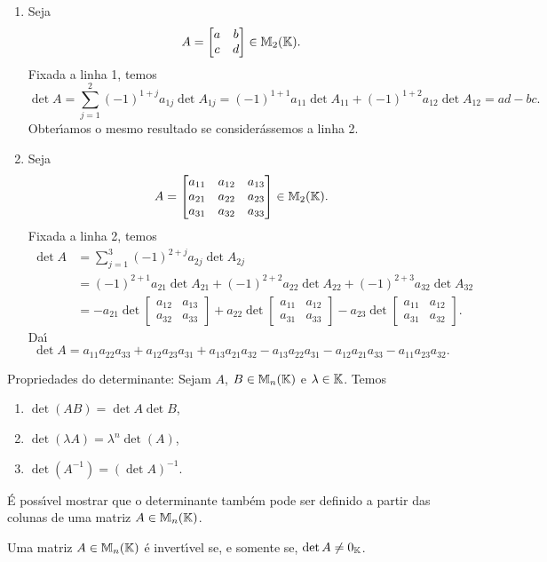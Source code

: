 \begin{exemplo}
\begin{enumerate}
	\item Seja
	\[
	A = \begin{bmatrix}
	a & b\\
	c & d
	\end{bmatrix} \in \mathbb{M}_2(\mathbb{K}).
	\]
	Fixada a linha 1, temos
	\[
	\det A = \sum_{j = 1}^2(-1)^{1 + j}a_{1j}\det A_{1j} = (-1)^{1 + 1}a_{11}\det A_{11} + (-1)^{1 + 2}a_{12}\det A_{12} = ad - bc.
	\]
	Obter{\'\i}amos o mesmo resultado se consider\'assemos a linha 2.

	\item Seja
	\[
	A = \begin{bmatrix}
	a_{11} & a_{12} & a_{13}\\
	a_{21} & a_{22} & a_{23}\\
	a_{31} & a_{32} & a_{33}
	\end{bmatrix} \in \mathbb{M}_2(\mathbb{K}).
	\]
	Fixada a linha 2, temos
	\begin{align*}
	\det A &= \sum_{j = 1}^3(-1)^{2 + j}a_{2j}\det A_{2j} \\ &= (-1)^{2 + 1}a_{21}\det A_{21} + (-1)^{2 + 2}a_{22}\det A_{22} + (-1)^{2 + 3}a_{32}\det A_{32}\\ &= -a_{21}\det\begin{bmatrix}a_{12} & a_{13}\\a_{32} & a_{33}\end{bmatrix} + a_{22}\det\begin{bmatrix}a_{11} & a_{12}\\a_{31} & a_{33}\end{bmatrix} - a_{23}\det\begin{bmatrix}a_{11} & a_{12}\\a_{31} & a_{32}\end{bmatrix}.
	\end{align*}
	Da{\'\i}
	\[
	\det A = a_{11}a_{22}a_{33} + a_{12}a_{23}a_{31} + a_{13}a_{21}a_{32} - a_{13}a_{22}a_{31} - a_{12}a_{21}a_{33} - 
	a_{11}a_{23}a_{32}.
	\]
\end{enumerate}
\end{exemplo}

Propriedades do determinante: Sejam $A$, $B \in \mathbb{M}_n(\mathbb{K})$ e $\lambda \in \mathbb{K}$. Temos
\begin{enumerate}
	\item $\det(AB) = \det A \det B$,
	\item $\det(\lambda A) = \lambda^n \det(A)$,
	\item $\det(A^{-1}) = (\det A)^{-1}$.
\end{enumerate}

\begin{observacao}
\'E poss{\'\i}vel mostrar que o determinante tamb\'em pode ser definido a partir das colunas de uma matriz $A \in \mathbb{M}_n(\mathbb{K})$.
\end{observacao}

\begin{teorema}
Uma matriz $A \in \mathbb{M}_n(\mathbb{K})$ \'e invert{\'\i}vel se, e somente se, $\det A \ne 0_{\mathbb{K}}$.
\end{teorema}